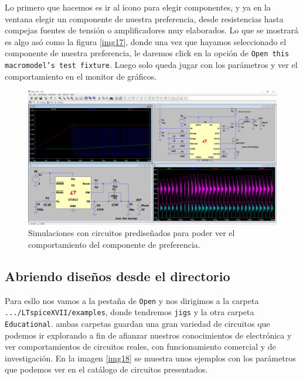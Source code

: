 \documentclass[a4paper]{article} %
\begin{document}
Lo primero que hacemos es ir al ícono para elegir componentes, y ya en la ventana elegir un componente de nuestra preferencia, desde resistencias hasta compejas fuentes de tensión o amplificadores muy elaborados. Lo que se mostrará es algo asó como la figura \eqref{img17}, donde una vez que hayamos seleccionado el componente de nuestra preferencia, le daremos click en la opción de \texttt{Open this macromodel's test fixture}. Luego solo queda jugar con los parámetros y ver el comportamiento en el monitor de gráficos.

\begin{figure} %
	\centering %
	\includegraphics[scale=0.3]{IMAGENES/img17} %
	\caption{Simulaciones con circuitos prediseñados para poder ver el comportamiento del componente de preferencia.} %
	\label{img17} %
\end{figure} %

\subsection{Abriendo diseños desde el directorio}

Para esllo nos vamos a la pestaña de \texttt{Open} y nos dirigimos a la carpeta \texttt{.../LTspiceXVII/examples}, donde tendremos \texttt{jigs} y la otra carpeta \texttt{Educational}. ambas carpetas guardan una gran variedad de circuitos que podemos ir explorando a fin de afianzar nuestros conocimientos de electrónica y ver comportamientos de circuitos reales, con funcionamiento comercial y de investigación. En la imagen \eqref{img18} se muestra unos ejemplos con los parámetros que podemos ver en el catálogo de circuitos presentados.
\end{document}

